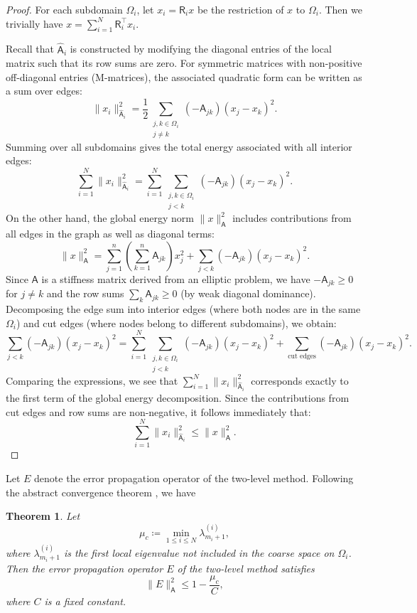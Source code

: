 \documentclass[preprint,12pt]{elsarticle}
\newtheorem{theorem}{Theorem}
\begin{document}
  \begin{proof}
    For each subdomain $\Omega_{i}$, let $x_{i}= \mathsf{R}_{i}x$ be the
    restriction of $x$ to $\Omega_{i}$. Then we trivially have $x = \sum_{i=1}^{N}
    \mathsf{R}_{i}^{\intercal}x_{i}$.

    Recall that $\widehat{\mathsf{A}}_{i}$ is constructed by modifying the diagonal
    entries of the local matrix such that its row sums are zero. For symmetric
    matrices with non-positive off-diagonal entries (M-matrices), the associated
    quadratic form can be written as a sum over edges:
    \[
      \|x_{i}\|_{\widehat{\mathsf{A}}_{i}}^{2}= \frac{1}{2}\sum_{\substack{j,k \in \Omega_i \\ j \neq k}}
      (-\mathsf{A}_{jk}) (x_{j}- x_{k})^{2}.
    \]
    Summing over all subdomains gives the total energy associated with all
    interior edges:
    \[
      \sum_{i=1}^{N}\|x_{i}\|_{\widehat{\mathsf{A}}_{i}}^{2}= \sum_{i=1}^{N}\sum_{\substack{j,k \in \Omega_i \\ j < k}}
      (-\mathsf{A}_{jk}) (x_{j}- x_{k})^{2}.
    \]
    On the other hand, the global energy norm $\|x\|_{\mathsf{A}}^{2}$ includes
    contributions from all edges in the graph as well as diagonal terms:
    \[
      \|x\|_{\mathsf{A}}^{2}= \sum_{j=1}^{n}\left(\sum_{k=1}^{n}\mathsf{A}_{jk}\right
      )x_{j}^{2}+ \sum_{j < k}(-\mathsf{A}_{jk})(x_{j}- x_{k})^{2}.
    \]
    Since $\mathsf{A}$ is a stiffness matrix derived from an elliptic problem,
    we have $-\mathsf{A}_{jk}\ge 0$ for $j \neq k$ and the row sums
    $\sum_{k}\mathsf{A}_{jk}\ge 0$ (by weak diagonal dominance). Decomposing the
    edge sum into interior edges (where both nodes are in the same $\Omega_{i}$)
    and cut edges (where nodes belong to different subdomains), we obtain:
    \[
      \sum_{j < k}(-\mathsf{A}_{jk})(x_{j}- x_{k})^{2}= \sum_{i=1}^{N}\sum_{\substack{j,k \in \Omega_i \\ j < k}}
      (-\mathsf{A}_{jk}) (x_{j}- x_{k})^{2}+ \sum_{\text{cut edges}}(-\mathsf{A}_{jk}
      )(x_{j}- x_{k})^{2}.
    \]
    Comparing the expressions, we see that
    $\sum_{i=1}^{N}\|x_{i}\|_{\widehat{\mathsf{A}}_{i}}^{2}$ corresponds exactly
    to the first term of the global energy decomposition. Since the contributions
    from cut edges and row sums are non-negative, it follows immediately that:
    \[
      \sum_{i=1}^{N}\|x_{i}\|_{\widehat{\mathsf{A}}_{i}}^{2}\le \|x\|_{\mathsf{A}}
      ^{2}.
    \]
  \end{proof}
  Let $E$ denote the error propagation operator of the two-level method. Following
  the abstract convergence theorem \cite{xu2017algebraic}, we have
  \begin{theorem}
    \label{thm:convergence} Let
    \[
      \mu_{c}\coloneqq \min_{1 \le i \le N}\lambda_{m_i+1}^{(i)},
    \]
    where $\lambda_{m_i+1}^{(i)}$ is the first local eigenvalue not included in the
    coarse space on $\Omega_{i}$. Then the error propagation operator $E$ of the
    two-level method satisfies
    \[
      \|E\|_{\mathsf{A}}^{2}\le 1 - \frac{\mu_{c}}{C},
    \]
    where $C$ is a fixed constant.
  \end{theorem}
\end{document}

